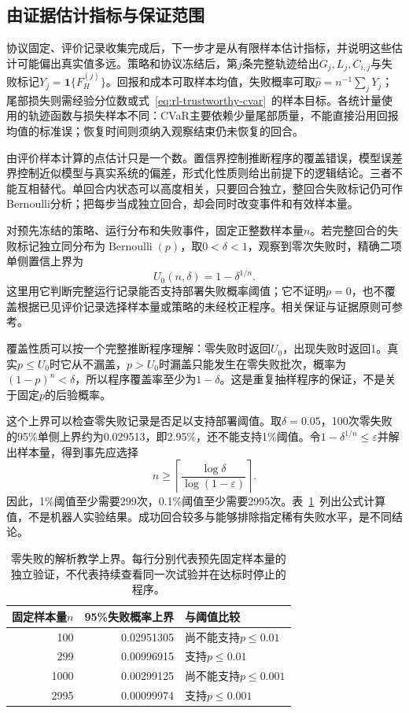 \subsection{由证据估计指标与保证范围}
\label{sec:rl-trustworthy-inference}

协议固定、评价记录收集完成后，下一步才是从有限样本估计指标，并说明这些估计可能偏出真实值多远。策略和协议冻结后，第$j$条完整轨迹给出$G_j,L_j,C_{i,j}$与失败标记$Y_j=\mathbf1\{F_H^{(j)}\}$。回报和成本可取样本均值，失败概率可取$\widehat p=n^{-1}\sum_jY_j$；尾部损失则需经验分位数或式~\eqref{eq:rl-trustworthy-cvar}~的样本目标。各统计量使用的轨迹函数与损失样本不同：CVaR主要依赖少量尾部质量，不能直接沿用回报均值的标准误；恢复时间则须纳入观察结束仍未恢复的回合。

由评价样本计算的点估计只是一个数。置信界控制推断程序的覆盖错误，模型误差界控制近似模型与真实系统的偏差，形式化性质则给出前提下的逻辑结论。三者不能互相替代。单回合内状态可以高度相关，只要回合独立，整回合失败标记仍可作Bernoulli分析；把每步当成独立回合，却会同时改变事件和有效样本量。

对预先冻结的策略、运行分布和失败事件，固定正整数样本量$n$。若完整回合的失败标记独立同分布为$\operatorname{Bernoulli}(p)$，取$0<\delta<1$，观察到零次失败时，精确二项单侧置信上界为
\[
 U_0(n,\delta)=1-\delta^{1/n}.
\]
这里用它判断完整运行记录能否支持部署失败概率阈值；它不证明$p=0$，也不覆盖根据已见评价记录选择样本量或策略的未经校正程序。相关保证与证据原则可参考。

覆盖性质可以按一个完整推断程序理解：零失败时返回$U_0$，出现失败时返回1。真实$p\leq U_0$时它从不漏盖，$p>U_0$时漏盖只能发生在零失败批次，概率为$(1-p)^n<\delta$，所以程序覆盖率至少为$1-\delta$。这是重复抽样程序的保证，不是关于固定$p$的后验概率。

这个上界可以检查零失败记录是否足以支持部署阈值。取$\delta=0.05$，100次零失败的95\%单侧上界约为0.029513，即2.95\%，还不能支持1\%阈值。令$1-\delta^{1/n}\leq\varepsilon$并解出样本量，得到事先应选择
\[
  n\geq
  \left\lceil\frac{\log\delta}{\log(1-\varepsilon)}\right\rceil.
\]
因此，1\%阈值至少需要299次，0.1\%阈值至少需要2995次。表~\ref{tab:rl-trustworthy-zero-failure}~列出公式计算值，不是机器人实验结果。成功回合较多与能够排除指定稀有失败水平，是不同结论。

\begin{table}[htbp]
  \centering
  \begin{tabular}{@{}rrl@{}}
    \toprule
    固定样本量$n$ & 95\%失败概率上界 & 与阈值比较 \\
    \midrule
    100  & 0.02951305 & 尚不能支持$p\leq0.01$ \\
    299  & 0.00996915 & 支持$p\leq0.01$ \\
    1000 & 0.00299125 & 尚不能支持$p\leq0.001$ \\
    2995 & 0.00099974 & 支持$p\leq0.001$ \\
    \bottomrule
  \end{tabular}
  \caption{零失败的解析教学上界。每行分别代表预先固定样本量的独立验证，不代表持续查看同一次试验并在达标时停止的程序。}
  \label{tab:rl-trustworthy-zero-failure}
\end{table}

